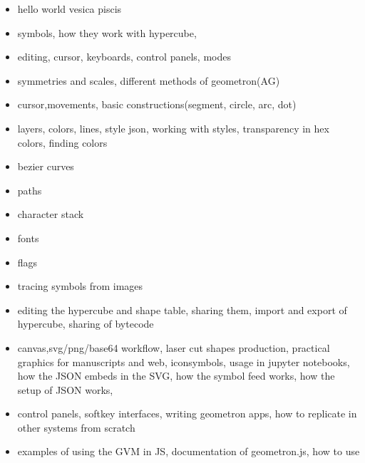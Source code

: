 \begin{itemize}
\tightlist
\item
hello world vesica piscis
\item
symbols, how they work with hypercube, 
\item
editing, cursor, keyboards, control panels, modes
\item
symmetries and scales, different methods of geometron(AG)
\item
cursor,movements, basic constructions(segment, circle, arc, dot)
\item
layers, colors, lines, style json, working with styles, transparency in hex colors, finding colors
\item
bezier curves
\item
paths
\item
character stack
\item
fonts
\item
flags
\item
tracing symbols from images
\item
editing the hypercube and shape table, sharing them, import and export of hypercube, sharing of bytecode
\item
canvas,svg/png/base64 workflow, laser cut shapes production, practical graphics for manuscripts and web, iconsymbols, usage in jupyter notebooks, how the JSON embeds in the SVG, how the symbol feed works, how the setup of JSON works,
\item
control panels, softkey interfaces, writing geometron apps, how to replicate in other systems from scratch
\item
examples of using the GVM in JS, documentation of geometron.js, how to use
\end{itemize}